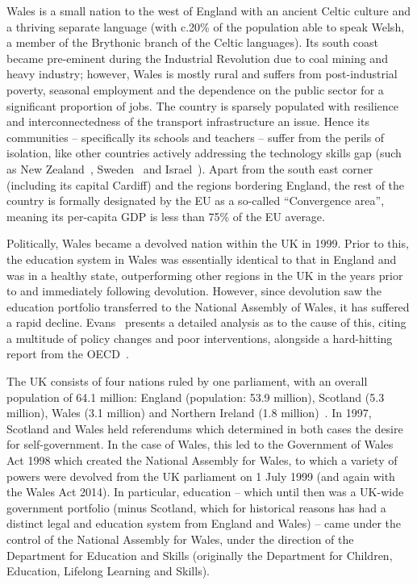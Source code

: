 Wales is a small nation to the west of England with an ancient Celtic
culture and a thriving separate language (with c.20\% of the
population able to speak Welsh, a member of the Brythonic branch of
the Celtic languages).  Its south coast became pre-eminent during the
Industrial Revolution due to coal mining and heavy industry; however,
Wales is mostly rural and suffers from post-industrial poverty,
seasonal employment and the dependence on the public sector for a
significant proportion of jobs. The country is sparsely populated with
resilience and interconnectedness of the transport infrastructure an
issue.  Hence its communities -- specifically its schools and teachers
-- suffer from the perils of isolation, like other countries actively
addressing the technology skills gap (such as New
Zealand~\cite{bell-et-al:2014}, Sweden~\cite{rolandsson+skogh:2014}
and Israel~\cite{gal-ezer+stephenson:2014}). Apart from the south east
corner (including its capital Cardiff) and the regions bordering
England, the rest of the country is formally designated by the EU as a
so-called ``Convergence area'', meaning its per-capita GDP is less
than 75\% of the EU average.

Politically, Wales became a devolved nation within the UK in 1999.
Prior to this, the education system in Wales was essentially
identical to that in England and was in a healthy state, outperforming
other regions in the UK in the years prior to and immediately
following devolution.  However, since devolution saw the education
portfolio transferred to the National Assembly of Wales, it has
suffered a rapid decline. Evans~\cite{Evans:2015} presents a
detailed analysis as to the cause of this, citing a multitude of
policy changes and poor interventions, alongside a hard-hitting report
from the OECD~\cite{oecdwales:2014}.

The UK consists of four nations ruled by one parliament, with an
overall population of 64.1 million: England (population: 53.9
million), Scotland (5.3 million), Wales (3.1 million) and Northern
Ireland (1.8 million)~\cite{onspop:2014}. In 1997, Scotland and Wales
held referendums which determined in both cases the desire for
self-government.  In the case of Wales, this led to the Government of
Wales Act 1998 which created the National Assembly for Wales, to which
a variety of powers were devolved from the UK parliament on 1 July
1999 (and again with the Wales Act 2014).  In particular, education --
which until then was a UK-wide government portfolio (minus Scotland,
which for historical reasons has had a distinct legal and education
system from England and Wales) -- came under the control of the
National Assembly for Wales, under the direction of the Department for
Education and Skills (originally the Department for Children,
Education, Lifelong Learning and Skills).

